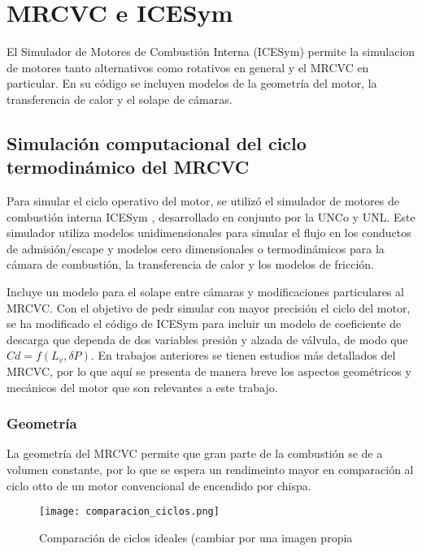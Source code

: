 \chapter{MRCVC e ICESym}

El Simulador de Motores de Combustión Interna (ICESym) permite la simulacion de
motores tanto alternativos como rotativos en general y el MRCVC en particular.
%
En su código se incluyen modelos de la geometría del motor, la transferencia
de calor y el solape de cámaras.

\section{Simulación computacional del ciclo termodinámico del MRCVC}

Para simular el ciclo operativo del motor, se utilizó el simulador de motores
de combustión interna ICESym \cite{icesym}, desarrollado en conjunto por la
UNCo y UNL.
%
Este simulador utiliza modelos unidimensionales para simular el flujo en los
conductos de admisión/escape y modelos cero dimensionales o termodinámicos
para la cámara de combustión, la transferencia de calor y los modelos de
fricción.
%

Incluye un modelo para el solape entre cámaras \cite{lopez16} y modificaciones
particulares al MRCVC.
%
Con el objetivo de pedr simular con mayor precisión el ciclo del motor, se ha 
modificado el código de ICESym para incluir un modelo de coeficiente de descarga
que dependa de dos variables presión y alzada de válvula, de modo que  
$Cd = f(L_v, \delta P)$.
%
En trabajos anteriores se tienen estudios más detallados del MRCVC, por lo que
aquí se presenta de manera breve los aspectos geométricos y mecánicos del motor
que son relevantes a este trabajo.

\subsection{Geometría}
%
La geometría del MRCVC permite que gran parte de la combustión se de a volumen
constante\cite{mrcvc_geom}, por lo que se espera un rendimeinto mayor en
comparación al ciclo otto de un motor convencional de encendido por chispa.
%

\begin{figure}
    \centering
    \texttt{[image: comparacion\_ciclos.png]}
    \caption{Comparación de ciclos ideales (cambiar por una imagen propia}
    \label{fig:comparacion_ciclos}
\end{figure}

